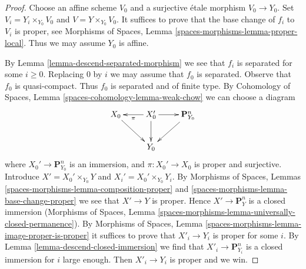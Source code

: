 \documentclass{stacks-project}
\theoremstyle{plain}
\theoremstyle{definition}
\theoremstyle{remark}
\numberwithin{equation}{subsection}
\begin{document}
\begin{proof}
Choose an affine scheme $V_0$ and a surjective \'etale morphism $V_0 \to Y_0$.
Set $V_i = Y_i \times_{Y_0} V_0$ and $V = Y \times_{Y_0} V_0$.
It suffices to prove that the base change of $f_i$ to $V_i$ is
proper, see Morphisms of Spaces, Lemma
\ref{spaces-morphisms-lemma-proper-local}.
Thus we may assume $Y_0$ is affine.

\medskip\noindent
By Lemma \ref{lemma-descend-separated-morphism} we see that
$f_i$ is separated for some $i \geq 0$. Replacing
$0$ by $i$ we may assume that $f_0$ is separated.
Observe that $f_0$ is quasi-compact. Thus $f_0$ is separated and
of finite type. By
Cohomology of Spaces, Lemma \ref{spaces-cohomology-lemma-weak-chow}
we can choose a diagram
$$
\xymatrix{
X_0 \ar[rd] & X_0' \ar[d] \ar[l]^\pi \ar[r] & \mathbf{P}^n_{Y_0} \ar[dl] \\
& Y_0 &
}
$$
where $X_0' \to \mathbf{P}^n_{Y_0}$ is an immersion, and
$\pi : X_0' \to X_0$ is proper and surjective. Introduce
$X' = X_0' \times_{Y_0} Y$ and $X_i' = X_0' \times_{Y_0} Y_i$.
By Morphisms of Spaces, Lemmas
\ref{spaces-morphisms-lemma-composition-proper} and
\ref{spaces-morphisms-lemma-base-change-proper}
we see that $X' \to Y$ is proper. Hence $X' \to \mathbf{P}^n_Y$ is
a closed immersion (Morphisms of Spaces, Lemma
\ref{spaces-morphisms-lemma-universally-closed-permanence}). By
Morphisms of Spaces, Lemma \ref{spaces-morphisms-lemma-image-proper-is-proper}
it suffices to prove that $X'_i \to Y_i$ is proper for some $i$.
By Lemma \ref{lemma-descend-closed-immersion}
we find that $X'_i \to \mathbf{P}^n_{Y_i}$ is
a closed immersion for $i$ large enough. Then $X'_i \to Y_i$
is proper and we win.
\end{proof}
\end{document}
